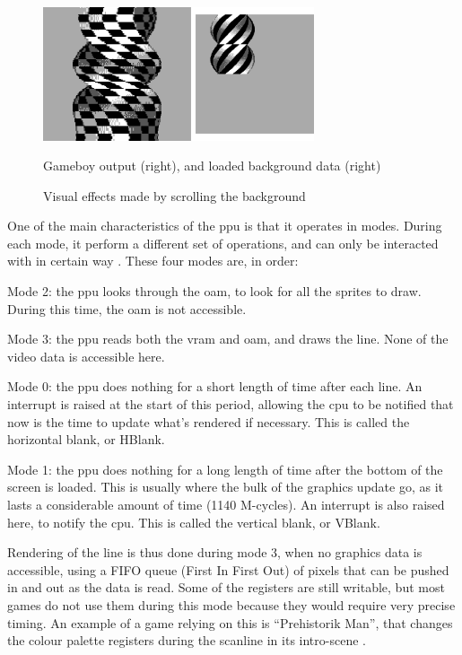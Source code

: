 \documentclass[11pt]{informatics-report}
\begin{document}
\begin{figure}[h]
    \centering
    \includegraphics[width=8cm]{images/background-transform}\\
    \caption{Visual effects made by scrolling the background}
    Gameboy output (right), and loaded background data (right)
    \label{fig:background-transform}
\end{figure}

One of the main characteristics of the \gls{ppu} is that it operates in modes. During each mode, it perform a different set of operations, and can only be interacted with in certain way \cite[LCD Status Registers]{pandoc}. These four modes are, in order:

\begin{compactitem}
	\item Mode 2: the \gls{ppu} looks through the \gls{oam}, to look for all the sprites to draw. During this time, the \gls{oam} is not accessible.
	\item Mode 3: the \gls{ppu} reads both the \gls{vram} and \gls{oam}, and draws the line. None of the video data is accessible here.
	\item Mode 0: the \gls{ppu} does nothing for a short length of time after each line. An interrupt is raised at the start of this period, allowing the \gls{cpu} to be notified that now is the time to update what's rendered if necessary. This is called the horizontal blank, or HBlank.
	\item Mode 1: the \gls{ppu} does nothing for a long length of time after the bottom of the screen is loaded. This is usually where the bulk of the graphics update go, as it lasts a considerable amount of time (1140 M-cycles). An interrupt is also raised here, to notify the \gls{cpu}. This is called the vertical blank, or VBlank.
\end{compactitem}

Rendering of the line is thus done during mode 3, when no graphics data is accessible, using a FIFO queue (First In First Out) of pixels that can be pushed in and out as the data is read. Some of the registers are still writable, but most games do not use them during this mode because they would require very precise timing. An example of a game relying on this is ``Prehistorik Man'', that changes the colour palette registers during the scanline in its intro-scene \cite[Tricky-to-emulate games]{gbdev_wiki}.
\end{document}
